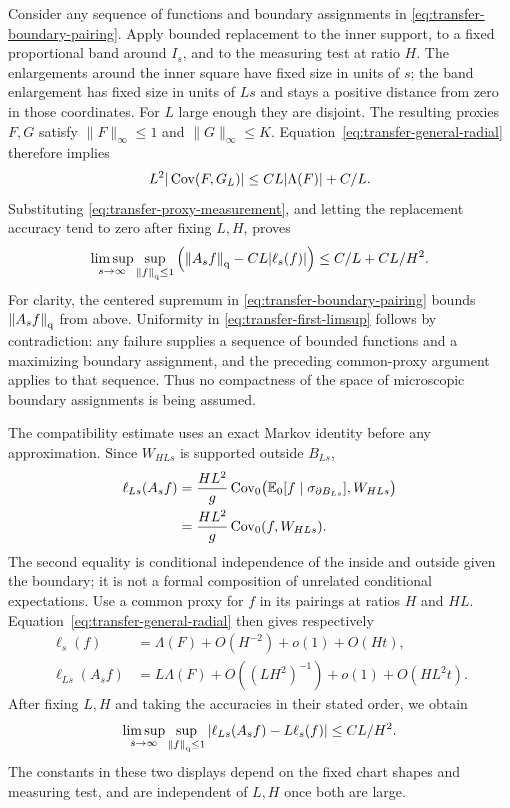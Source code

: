 Consider any sequence of functions and boundary assignments in
\eqref{eq:transfer-boundary-pairing}.  Apply bounded replacement to
the inner support, to a fixed proportional band around $I_s$, and to
the measuring test at ratio $H$.  The enlargements around the inner
square have fixed size in units of $s$; the band enlargement has fixed
size in units of $Ls$ and stays a positive distance from zero in
those coordinates.  For $L$ large enough they are disjoint.  The
resulting proxies $F,G$ satisfy $\|F\|_\infty\leq1$ and
$\|G\|_\infty\leq K$.  Equation~\eqref{eq:transfer-general-radial}
therefore implies
\[
 L^2|\operatorname{Cov}(F,G_L)|
 \leq CL|\Lambda(F)|+C/L.
\]
Substituting \eqref{eq:transfer-proxy-measurement}, and letting the
replacement accuracy tend to zero after fixing $L,H$, proves
\begin{equation}
 \limsup_{s\to\infty}\sup_{\left\|f\right\|_{\mathrm q}\leq1}
 \left(\left\|A_sf\right\|_{\mathrm q}-CL|\ell_s(f)|\right)
 \leq C/L+CL/H^2.
 \label{eq:transfer-first-limsup}
\end{equation}
For clarity, the centered supremum in
\eqref{eq:transfer-boundary-pairing} bounds $\left\|A_sf\right\|_{\mathrm q}$ from
above.  Uniformity in \eqref{eq:transfer-first-limsup} follows by
contradiction: any failure supplies a sequence of bounded functions
and a maximizing boundary assignment, and the preceding common-proxy
argument applies to that sequence.  Thus no compactness of the
space of microscopic boundary assignments is being assumed.

The compatibility estimate uses an exact Markov identity before any
approximation.  Since $W_{HLs}$ is supported outside $B_{Ls}$,
\begin{align}
 \ell_{Ls}(A_sf)
 &=\frac{HL^2}{g}\operatorname{Cov}_0\bigl(
      \mathbb E_0[f\mid\sigma_{\partial B_{Ls}}],W_{HLs}\bigr)\notag\\
 &=\frac{HL^2}{g}\operatorname{Cov}_0(f,W_{HLs}).
 \label{eq:transfer-exact-tower}
\end{align}
The second equality is conditional independence of the inside and
outside given the boundary; it is not a formal composition of unrelated
conditional expectations.  Use a common proxy for $f$ in its pairings
at ratios $H$ and $HL$.  Equation~\eqref{eq:transfer-general-radial}
then gives respectively
\begin{align*}
 \ell_s(f)&=\Lambda(F)+O(H^{-2})+o(1)+O(Ht),\\
 \ell_{Ls}(A_sf)&=L\Lambda(F)
                  +O((LH^2)^{-1})+o(1)+O(HL^2t).
\end{align*}
After fixing $L,H$ and taking the accuracies in their stated order,
we obtain
\begin{equation}
 \limsup_{s\to\infty}\sup_{\left\|f\right\|_{\mathrm q}\leq1}
       |\ell_{Ls}(A_sf)-L\ell_s(f)|\leq CL/H^2.
 \label{eq:transfer-second-limsup}
\end{equation}
The constants in these two displays depend on the fixed chart shapes
and measuring test, and are independent of $L,H$ once both are large.

